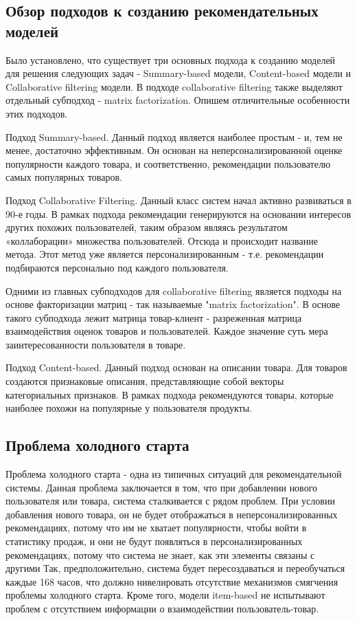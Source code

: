 \documentclass[14pt]{mmcs_article}
\begin{document}
\subsection{Обзор подходов к созданию рекомендательных моделей}
Было установлено, что существует три основных подхода к созданию моделей для решения следующих задач - Summary-based модели, Content-based модели и Collaborative filtering модели. В подходе collaborative filtering также выделяют отдельный субподход - matrix factorization.  Опишем отличительные особенности этих подходов. 

Подход Summary-based. Данный подход является наиболее простым - и, тем не менее, достаточно эффективным. Он основан на неперсонализированной оценке популярности каждого товара, и соответственно, рекомендации пользователю самых популярных товаров.

Подход Collaborative Filtering. Данный класс систем начал активно развиваться в 90-е годы. В рамках подхода рекомендации генерируются на основании интересов других похожих пользователей, таким образом являясь результатом «коллаборации» множества пользователей. Отсюда и  происходит название метода. Этот метод уже является персонализированным - т.е. рекомендации подбираются персонально под каждого пользователя.

Одними из главных субподходов для collaborative filtering является подходы на основе факторизации матриц - так называемые "matrix factorization". В основе такого субподхода лежит матрица товар-клиент - разреженная матрица взаимодействия оценок товаров и пользователей. Каждое значение суть мера заинтересованности пользователя в товаре. 

Подход  Content-based. Данный подход основан на описании товара. Для товаров создаются признаковые описания, представляющие собой векторы категориальных признаков.
В рамках подхода рекомендуются товары, которые наиболее похожи на популярные у пользователя продукты.

\subsection{Проблема холодного старта}
Проблема холодного старта - одна из типичных ситуаций для рекомендательной системы. Данная проблема заключается в том, что при добавлении нового пользователя или товара, система сталкивается с рядом проблем. При условии добавления нового товара,  он не будет отображаться в неперсонализированных рекомендациях, потому что им не хватает популярности, чтобы войти в статистику продаж, и они не будут появляться в персонализированных рекомендациях, потому что система не знает, как эти элементы связаны с другими  Так, предположительно, система будет пересоздаваться и переобучаться каждые 168 часов, что должно нивелировать отсутствие механизмов смягчения проблемы холодного старта. Кроме того, модели item-based не испытывают проблем с отсутствием информации о взаимодействии пользователь-товар.
\end{document}
